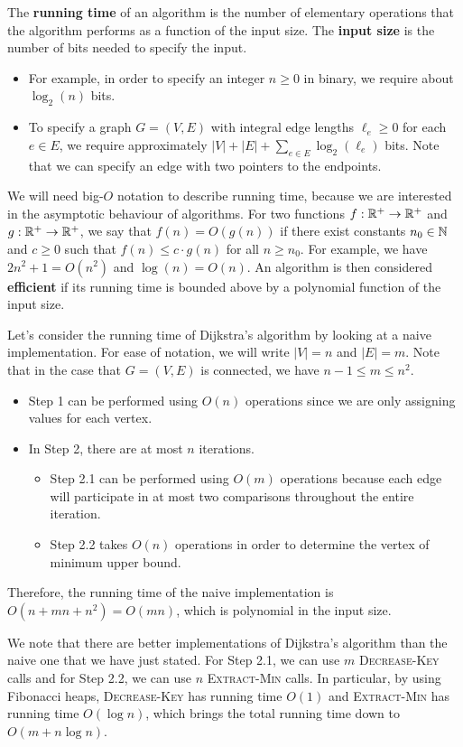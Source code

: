 The {\bf running time} of an algorithm is the number of elementary operations 
that the algorithm performs as a function of the input size. The {\bf input 
size} is the number of bits needed to specify the input. 
\begin{itemize}
    \item For example, in order to specify an integer $n \geq 0$ in binary, 
    we require about $\log_2(n)$ bits. 
    \item To specify a graph $G = (V, E)$ with integral edge lengths 
    $\ell_e \geq 0$ for each $e \in E$, we require approximately 
    $|V| + |E| + \sum_{e\in E} \log_2(\ell_e)$ bits. Note that we can 
    specify an edge with two pointers to the endpoints.
\end{itemize} 
We will need big-$O$ notation to describe running time, because we are 
interested in the asymptotic behaviour of algorithms. For two functions
$f : \mathbb{R}^+ \to \mathbb{R}^+$ and $g : \mathbb{R}^+ \to \mathbb{R}^+$, we say that $f(n) = 
O(g(n))$ if there exist constants $n_0 \in \mathbb{N}$ and $c \geq 0$ such that 
$f(n) \leq c \cdot g(n)$ for all $n \geq n_0$. For example, we have 
$2n^2 + 1 = O(n^2)$ and $\log(n) = O(n)$. An algorithm is then considered 
{\bf efficient} if its running time is bounded above by a polynomial function 
of the input size. 

Let's consider the running time of Dijkstra's algorithm by looking 
at a naive implementation. For ease of notation, we will write 
$|V| = n$ and $|E| = m$. Note that in the case that $G = (V, E)$ is connected, 
we have $n-1 \leq m \leq n^2$.
\begin{itemize}
    \item Step 1 can be performed using $O(n)$ operations since we are only
    assigning values for each vertex. 
    \item In Step 2, there are at most $n$ iterations. 
    \begin{itemize}
        \item Step 2.1 can be performed using $O(m)$ operations because 
        each edge will participate in at most two comparisons throughout the 
        entire iteration. 
        \item Step 2.2 takes $O(n)$ operations in order to determine the 
        vertex of minimum upper bound. 
    \end{itemize}
\end{itemize}
Therefore, the running time of the naive implementation is 
$O(n + mn + n^2) = O(mn)$, which is polynomial in the input size.  

We note that there are better implementations of Dijkstra's algorithm 
than the naive one that we have just stated. For Step 2.1, we can 
use $m$ \textsc{Decrease-Key} calls and for Step 2.2, we can use 
$n$ \textsc{Extract-Min} calls. In particular, by using Fibonacci heaps, 
\textsc{Decrease-Key} has running time $O(1)$ and \textsc{Extract-Min} 
has running time $O(\log n)$, which brings the total running time down to 
$O(m + n\log n)$.